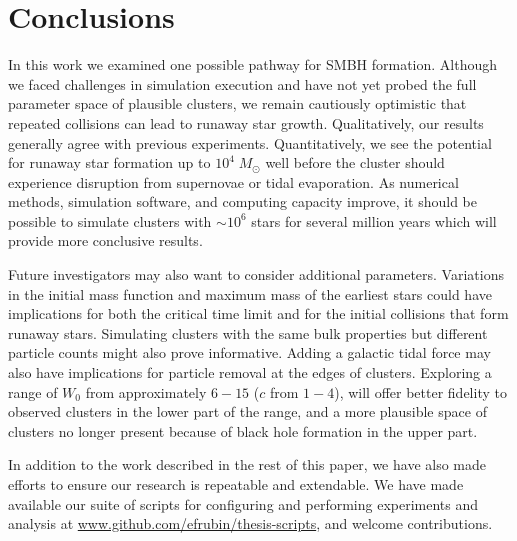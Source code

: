 \documentclass{princeton_astro_thesis}
\newcommand\Msun{\; M_\odot}
\numberwithin{equation}{section}
\begin{document}
\chapter{Conclusions} \label{ch:Conclusions}
In this work we examined one possible pathway for \ac{SMBH} formation. Although we faced challenges in simulation execution and have not yet probed the full parameter space of plausible clusters, we remain cautiously optimistic that repeated collisions can lead to runaway star growth.  Qualitatively, our results generally agree with previous experiments. Quantitatively, we see the potential for runaway star formation up to $10^4 \Msun$ well before the cluster should experience disruption from supernovae or tidal evaporation. As numerical methods, simulation software, and computing capacity improve, it should be possible to simulate clusters with $\sim 10^6$ stars for several million years which will provide more conclusive results.

Future investigators may also want to consider additional parameters. Variations in the initial mass function and maximum mass of the earliest stars could have implications for both the critical time limit and for the initial collisions that form runaway stars. Simulating clusters with the same bulk properties but different particle counts might also prove informative. Adding a galactic tidal force may also have implications for particle removal at the edges of clusters. Exploring a range of $W_{0}$ from approximately $6 - 15$ ($c$ from $1 - 4$), will offer better fidelity to observed clusters in the lower part of the range, and a more plausible space of clusters no longer present because of black hole formation in the upper part.

In addition to the work described in the rest of this paper, we have also made efforts to ensure our research is repeatable and extendable. We have made available our suite of scripts for configuring and performing experiments and analysis at \url{www.github.com/efrubin/thesis-scripts}, and welcome contributions.









\nocite{*}
\end{document}
